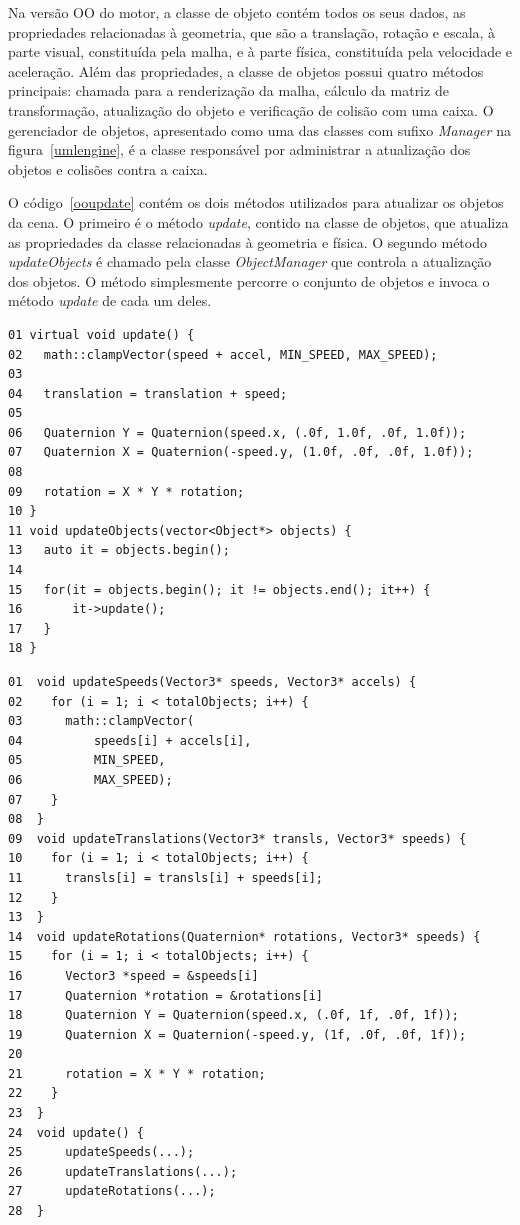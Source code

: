 Na versão OO do motor, a classe de objeto contém todos os seus dados, as propriedades 
relacionadas à geometria, que são a translação, rotação e escala, à parte visual, 
constituída pela malha, e à parte física, constituída pela velocidade e aceleração. 
Além das propriedades, a classe de objetos possui quatro métodos principais: 
chamada para a renderização da malha, cálculo da matriz de transformação, 
atualização do objeto e verificação de colisão com uma caixa. O gerenciador de objetos, 
apresentado como uma das classes com sufixo \textit{Manager} na figura~\ref{umlengine}, 
é a classe responsável por administrar a atualização dos objetos e colisões contra a 
caixa.

O código~\ref{ooupdate} contém os dois métodos utilizados para atualizar os objetos 
da cena. O primeiro é o método \textit{update}, contido na classe de objetos, que atualiza 
as propriedades da classe relacionadas à geometria e física. O segundo método 
\textit{updateObjects} é chamado pela classe \textit{ObjectManager} que controla a 
atualização dos objetos. O método simplesmente percorre o conjunto de objetos e 
invoca o método \textit{update} de cada um deles.

\begin{lstlisting}[frame=single, caption={Métodos para atualização dos objetos versão OO}, label=ooupdate]
01 virtual void update() {
02   math::clampVector(speed + accel, MIN_SPEED, MAX_SPEED);
03
04   translation = translation + speed;
05
06   Quaternion Y = Quaternion(speed.x, (.0f, 1.0f, .0f, 1.0f));
07   Quaternion X = Quaternion(-speed.y, (1.0f, .0f, .0f, 1.0f));
08
09   rotation = X * Y * rotation;
10 }
11 void updateObjects(vector<Object*> objects) {
13   auto it = objects.begin();
14
15   for(it = objects.begin(); it != objects.end(); it++) {
16       it->update();
17   }
18 }
\end{lstlisting}

\newpage

\begin{lstlisting}[frame=single, caption={Métodos para atualização dos objetos versão OD}, label=odupdate]
01  void updateSpeeds(Vector3* speeds, Vector3* accels) {
02    for (i = 1; i < totalObjects; i++) {
03      math::clampVector(
04          speeds[i] + accels[i], 
05          MIN_SPEED, 
06          MAX_SPEED);
07    }
08  }
09  void updateTranslations(Vector3* transls, Vector3* speeds) {
10    for (i = 1; i < totalObjects; i++) {
11      transls[i] = transls[i] + speeds[i];
12    }
13  }
14  void updateRotations(Quaternion* rotations, Vector3* speeds) {
15    for (i = 1; i < totalObjects; i++) {
16      Vector3 *speed = &speeds[i]
17      Quaternion *rotation = &rotations[i]
18      Quaternion Y = Quaternion(speed.x, (.0f, 1f, .0f, 1f));
19      Quaternion X = Quaternion(-speed.y, (1f, .0f, .0f, 1f));
20
21      rotation = X * Y * rotation;
22    }
23  }
24  void update() {
25      updateSpeeds(...);
26      updateTranslations(...);
27      updateRotations(...);
28  }
\end{lstlisting}

